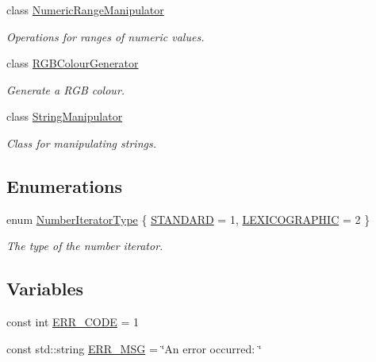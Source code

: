 \begin{DoxyCompactItemize}
class \hyperlink{classmultiscale_1_1NumericRangeManipulator}{\-Numeric\-Range\-Manipulator}
\begin{DoxyCompactList}\small\item\em \-Operations for ranges of numeric values. \end{DoxyCompactList}\item 
class \hyperlink{classmultiscale_1_1RGBColourGenerator}{\-R\-G\-B\-Colour\-Generator}
\begin{DoxyCompactList}\small\item\em \-Generate a \-R\-G\-B colour. \end{DoxyCompactList}\item 
class \hyperlink{classmultiscale_1_1StringManipulator}{\-String\-Manipulator}
\begin{DoxyCompactList}\small\item\em \-Class for manipulating strings. \end{DoxyCompactList}\end{DoxyCompactItemize}
\subsection*{\-Enumerations}
\begin{DoxyCompactItemize}
\item 
enum \hyperlink{namespacemultiscale_a6ef911f4d48a4bf5e657c237ec169ff5}{\-Number\-Iterator\-Type} \{ \hyperlink{namespacemultiscale_a6ef911f4d48a4bf5e657c237ec169ff5aa048887eb0360a4b70dff5452133f42e}{\-S\-T\-A\-N\-D\-A\-R\-D} =  1, 
\hyperlink{namespacemultiscale_a6ef911f4d48a4bf5e657c237ec169ff5a2cba3a0174cc5c1d555ee13dcf6cda15}{\-L\-E\-X\-I\-C\-O\-G\-R\-A\-P\-H\-I\-C} =  2
 \}
\begin{DoxyCompactList}\small\item\em \-The type of the number iterator. \end{DoxyCompactList}\end{DoxyCompactItemize}
\subsection*{\-Variables}
\begin{DoxyCompactItemize}
\item 
const int \hyperlink{namespacemultiscale_a4ee40795105048ee371efeeb7962ecf6}{\-E\-R\-R\-\_\-\-C\-O\-D\-E} = 1
\item 
const std\-::string \hyperlink{namespacemultiscale_a06490e4e11ef359aa0260f96579ce584}{\-E\-R\-R\-\_\-\-M\-S\-G} = \char`\"{}\-An error occurred\-: \char`\"{}
\end{DoxyCompactItemize}


